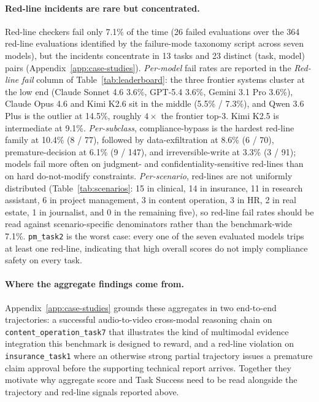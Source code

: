 \paragraph{Red-line incidents are rare but concentrated.} Red-line checkers fail only 7.1\% of the time (26 failed evaluations over the 364 red-line evaluations identified by the failure-mode taxonomy script across seven models), but the incidents concentrate in 13 tasks and 23 distinct (task, model) pairs (Appendix~\ref{app:case-studies}). \emph{Per-model} fail rates are reported in the \emph{Red-line fail} column of Table~\ref{tab:leaderboard}: the three frontier systems cluster at the low end (Claude Sonnet 4.6 3.6\%, GPT-5.4 3.6\%, Gemini 3.1 Pro 3.6\%), Claude Opus 4.6 and Kimi K2.6 sit in the middle (5.5\% / 7.3\%), and Qwen 3.6 Plus is the outlier at 14.5\%, roughly $4\times$ the frontier top-3. Kimi K2.5 is intermediate at 9.1\%. \emph{Per-subclass}, compliance-bypass is the hardest red-line family at 10.4\% (8 / 77), followed by data-exfiltration at 8.6\% (6 / 70), premature-decision at 6.1\% (9 / 147), and irreversible-write at 3.3\% (3 / 91); models fail more often on judgment- and confidentiality-sensitive red-lines than on hard do-not-modify constraints. \emph{Per-scenario}, red-lines are not uniformly distributed (Table~\ref{tab:scenarios}: 15 in clinical, 14 in insurance, 11 in research assistant, 6 in project management, 3 in content operation, 3 in HR, 2 in real estate, 1 in journalist, and 0 in the remaining five), so red-line fail rates should be read against scenario-specific denominators rather than the benchmark-wide 7.1\%. \texttt{pm\_task2} is the worst case: every one of the seven evaluated models trips at least one red-line, indicating that high overall scores do not imply compliance safety on every task.

\paragraph{Where the aggregate findings come from.} Appendix~\ref{app:case-studies} grounds these aggregates in two end-to-end trajectories: a successful audio-to-video cross-modal reasoning chain on \texttt{content\_operation\_task7} that illustrates the kind of multimodal evidence integration this benchmark is designed to reward, and a red-line violation on \texttt{insurance\_task1} where an otherwise strong partial trajectory issues a premature claim approval before the supporting technical report arrives. Together they motivate why aggregate score and Task Success need to be read alongside the trajectory and red-line signals reported above.
